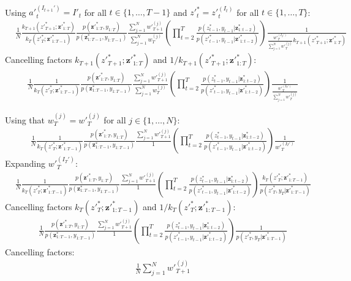 \documentclass[11pt]{article}
\newcommand{\z}{\mathbf{z}}
\begin{document}
{\begin{minipage}{\linewidth}
\begin{align*}
\end{align*}
Using ${a'}_t^{(I_{t+1}')} = I'_t$ for all $t \in \{1, \ldots, T-1\}$ and ${z'}^*_t = {z'}_t^{(I_t)}$ for all $t \in \{1, \ldots, T\}$:
\begin{align*}
&
\frac{1}{N}
\frac{
k_{T+1}({z'}_{T+1}^*; {\z'}_{1:T}^*)
}{
k_T({z'}_T^*; {\z'}_{1:T-1}^*)
}
\frac{p({\z'}_{1:T}^*, y_{1:T})}{p({\z}_{1:T-1}^*, y_{1:T-1})}
\frac{
\sum_{j=1}^N {w'}_{T+1}^{(j)}
}{
\sum_{j=1}^N {w}_{T}^{(j)}
}
\left( \prod_{t=2}^T \frac{p(z_{t-1}^*, y_{t-1} | {\z}_{1:t-2}^{*})}{p({z'}_{t-1}^*, y_{t-1} | {\z'}_{1:t-2}^*)} \right)
\frac{1}{
\frac{{w'}_{T}^{(I_T')}}{\sum_{j=1}^N {w'}_{T}^{(j)}} k_{T+1}({z'}_{T+1}^{*}; {\z'}_{1:T}^{*} )
}
\end{align*}
Cancelling factors $k_{T+1}({z'}_{T+1}^*; {\z'}_{1:T}^*)$ and $1 / k_{T+1}({z'}_{T+1}^*; {\z'}_{1:T}^*)$:
\begin{align*}
&
\frac{1}{N}
\frac{
1
}{
k_T({z'}_T^*; {\z'}_{1:T-1}^*)
}
\frac{p({\z'}_{1:T}^*, y_{1:T})}{p({\z}_{1:T-1}^*, y_{1:T-1})}
\frac{
\sum_{j=1}^N {w'}_{T+1}^{(j)}
}{
\sum_{j=1}^N {w}_{T}^{(j)}
}
\left( \prod_{t=2}^T \frac{p(z_{t-1}^*, y_{t-1} | {\z}_{1:t-2}^{*})}{p({z'}_{t-1}^*, y_{t-1} | {\z'}_{1:t-2}^*)} \right)
\frac{1}{
\frac{{w'}_{T}^{(I_T')}}{\sum_{j=1}^N {w'}_{T}^{(j)}}
}
\end{align*}

Using that $w_T^{(j)} = {w'}_T^{(j)}$ for all $j \in \{1, \ldots, N\}$:
\begin{align*}
&
\frac{1}{N}
\frac{
1
}{
k_T({z'}_T^*; {\z'}_{1:T-1}^*)
}
\frac{p({\z'}_{1:T}^*, y_{1:T})}{p({\z}_{1:T-1}^*, y_{1:T-1})}
\frac{
\sum_{j=1}^N {w'}_{T+1}^{(j)}
}{
1
}
\left( \prod_{t=2}^T \frac{p(z_{t-1}^*, y_{t-1} | {\z}_{1:t-2}^{*})}{p({z'}_{t-1}^*, y_{t-1} | {\z'}_{1:t-2}^*)} \right)
\frac{1}{
{w'}_{T}^{(I_T')}
}
\end{align*}
Expanding ${w'}_T^{(I_T')}$:
\begin{align*}
&
\frac{1}{N}
\frac{
1
}{
k_T({z'}_T^*; {\z'}_{1:T-1}^*)
}
\frac{p({\z'}_{1:T}^*, y_{1:T})}{p({\z}_{1:T-1}^*, y_{1:T-1})}
\frac{
\sum_{j=1}^N {w'}_{T+1}^{(j)}
}{
1
}
\left( \prod_{t=2}^T \frac{p(z_{t-1}^*, y_{t-1} | {\z}_{1:t-2}^{*})}{p({z'}_{t-1}^*, y_{t-1} | {\z'}_{1:t-2}^*)} \right)
\frac{
k_T({z'}_{T}^*; {\z'}_{1:T-1}^*)
}{
p({z'}_{T}^*, y_T| {\z'}_{1:T-1}^*)
}
\end{align*}
Cancelling factors $k_T({z'}_T^*; {\z'}_{1:T-1}^*)$ and $1 / k_T({z'}_T^*; {\z'}_{1:T-1}^*)$:
\begin{align*}
&
\frac{1}{N}
\frac{p({\z'}_{1:T}^*, y_{1:T})}{p({\z}_{1:T-1}^*, y_{1:T-1})}
\frac{
\sum_{j=1}^N {w'}_{T+1}^{(j)}
}{
1
}
\left( \prod_{t=2}^T \frac{p(z_{t-1}^*, y_{t-1} | {\z}_{1:t-2}^{*})}{p({z'}_{t-1}^*, y_{t-1} | {\z'}_{1:t-2}^*)} \right)
\frac{
1
}{
p({z'}_{T}^*, y_T| {\z'}_{1:T-1}^*)
}
\end{align*}
Cancelling factors:
\begin{align*}
& \frac{1}{N} \sum_{j=1}^N {w'}_{T+1}^{(j)}
\end{align*}
\end{minipage}
} %
\end{document}

